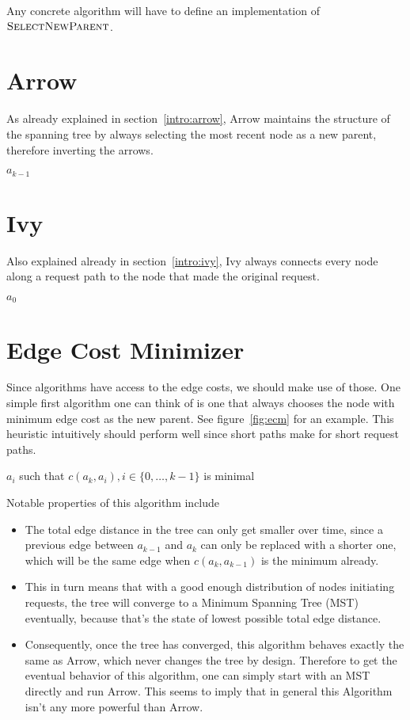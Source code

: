 \documentclass[a4paper, oneside]{discothesis}
\begin{document}
Any concrete algorithm will have to define an implementation of $\textsc{SelectNewParent}$. 

\section{Arrow}

As already explained in section~\ref{intro:arrow}, Arrow maintains the structure of the spanning tree by always selecting the most recent node as a new parent, therefore inverting the arrows.
\begin{algorithmic}
\State\Return $a_{k-1}$
\EndFunction
\end{algorithmic}

\section{Ivy}

Also explained already in section~\ref{intro:ivy}, Ivy always connects every node along a request path to the node that made the original request.
\begin{algorithmic}
\State\Return $a_0$
\EndFunction
\end{algorithmic}

\section{Edge Cost Minimizer}

Since algorithms have access to the edge costs, we should make use of those. One simple first algorithm one can think of is one that always chooses the node with minimum edge cost as the new parent. See figure~\ref{fig:ecm} for an example. This heuristic intuitively should perform well since short paths make for short request paths.
\begin{algorithmic}
\State\Return$a_i$ such that $c(a_k,a_i),i\in\{0,\dots,k-1\}$ is minimal
\EndFunction
\end{algorithmic}

Notable properties of this algorithm include
\begin{itemize}
\item The total edge distance in the tree can only get smaller over time, since a previous edge between $a_{k-1}$ and $a_k$ can only be replaced with a shorter one, which will be the same edge when $c(a_k,a_{k-1})$ is the minimum already.
\item This in turn means that with a good enough distribution of nodes initiating requests, the tree will converge to a Minimum Spanning Tree (MST) eventually, because that's the state of lowest possible total edge distance.
\item Consequently, once the tree has converged, this algorithm behaves exactly the same as Arrow, which never changes the tree by design. Therefore to get the eventual behavior of this algorithm, one can simply start with an MST directly and run Arrow. This seems to imply that in general this Algorithm isn't any more powerful than Arrow.
\end{itemize}
\end{document}

